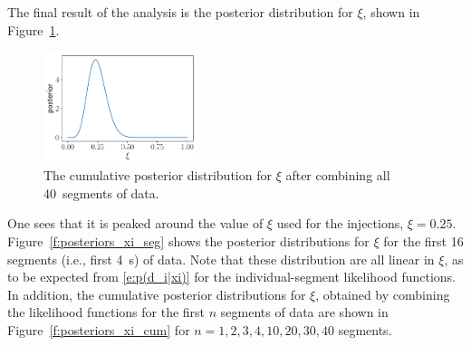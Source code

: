 The final result of the analysis is the posterior distribution
for $\xi$, shown in Figure~\ref{f:posterior_xi}.
%
\begin{figure}[htbp!]
\begin{center}
\includegraphics[width=0.4\textwidth]{Figures/posterior_xi}
\caption{The cumulative posterior distribution for $\xi$ after 
combining all 40~segments of data.}
\label{f:posterior_xi}
\end{center}
\end{figure}
%
One sees that it is peaked around the value of $\xi$ used for 
the injections, $\xi=0.25$.
Figure~\ref{f:posteriors_xi_seg} shows the posterior distributions
for $\xi$ for the first 16 segments (i.e., first 4~s) of data.
Note that these distribution are all linear in $\xi$, as to be
expected from \eqref{e:p(d_i|xi)} for the individual-segment 
likelihood functions.
In addition,
the cumulative posterior distributions for $\xi$, obtained by 
combining the likelihood functions for the first $n$ segments of
data are shown in Figure~\ref{f:posteriors_xi_cum} for 
$n=1,2,3,4,10,20,30,40$ segments.
%
